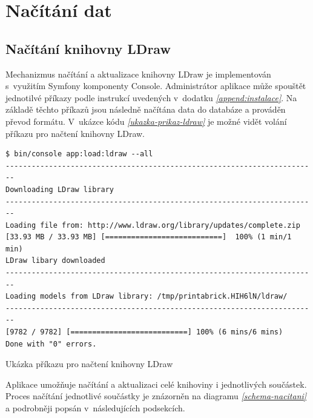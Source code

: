 \section{Načítání dat}

\subsection{Načítání knihovny LDraw}
Mechanizmus načítání a aktualizace knihovny LDraw je implementován s~využitím Symfony komponenty Console. Administrátor aplikace může spouštět jednotilvé příkazy podle instrukcí uvedených v~dodatku \emph{\ref{append:instalace}}. Na základě těchto příkazů jsou následně načítána data do databáze a prováděn převod formátu. V~ukázce kódu \emph{\ref{ukazka-prikaz-ldraw}} je možné vidět volání příkazu pro načtení knihovny LDraw.

\begin{listing}[htbp]
        \begin{verbatim}
$ bin/console app:load:ldraw --all
------------------------------------------------------------------------
Downloading LDraw library
------------------------------------------------------------------------
Loading file from: http://www.ldraw.org/library/updates/complete.zip
[33.93 MB / 33.93 MB] [===========================]  100% (1 min/1 min)
LDraw libary downloaded
------------------------------------------------------------------------
Loading models from LDraw library: /tmp/printabrick.HIH6lN/ldraw/
------------------------------------------------------------------------
[9782 / 9782] [===========================] 100% (6 mins/6 mins) 
Done with "0" errors.
        \end{verbatim}
    \caption{Ukázka příkazu pro načtení knihovny LDraw\label{ukazka-prikaz-ldraw}}
\end{listing}

Aplikace umožňuje načítání a aktualizaci celé knihoviny i jednotlivých součástek. Proces načítání jednotlivé součástky je znázorněn na diagramu \emph{\ref{schema-nacitani}} a podrobněji popsán v~následujících podsekcích.

